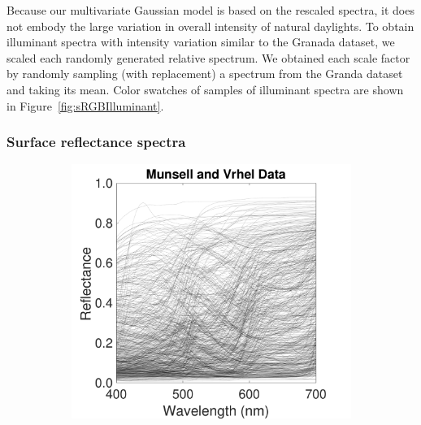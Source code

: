 \documentclass{jov}
\begin{document}
Because our multivariate Gaussian model is based on the rescaled spectra, it does not embody the large variation in overall intensity of natural daylights.
To obtain illuminant spectra with intensity variation similar to the Granada dataset, we scaled each randomly generated relative spectrum.
We obtained each scale factor by randomly sampling (with replacement) a spectrum from the Granda dataset and taking its mean. 
Color swatches of samples of illuminant spectra are shown in Figure~\ref{fig:sRGBIlluminant}.

\subsubsection{Surface reflectance spectra}
\begin{figure}
\centering
	\begin{subfigure}{0.24 \textwidth}
    \centering
            \caption{}
        \includegraphics[width=\textwidth]{../FiguresDraft4/Figure7/Figure7_a.pdf}
        \label{fig:reflectanceSpectra}
    \end{subfigure}
    \begin{subfigure}{0.24 \textwidth}
    \centering
        \caption{}

\end{subfigure}
\end{figure}
\end{document}

